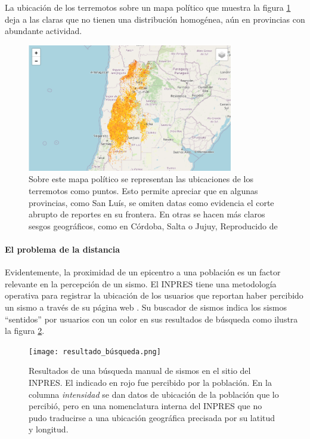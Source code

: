 \documentclass[a4paper]{report}
\begin{document}
La ubicación de los terremotos sobre un mapa político que muestra la figura \ref{fig:terremotosMapa} deja a las claras que no tienen una distribución homogénea, aún en provincias con abundante actividad.

\begin{figure}[!ht]
\centering
\includegraphics[width=0.8\textwidth]{terremotosMapa.png}
\caption{Sobre este mapa político se representan las ubicaciones de los terremotos como puntos. Esto permite apreciar que en algunas provincias, como San Luís, se omiten datas como evidencia el corte abrupto de reportes en su frontera. En otras se hacen más claros sesgos geográficos, como en Córdoba, Salta o Jujuy, 
Reproducido de \cite{daniela_parada_ic-datasets-docencia_nodate}}
\label{fig:terremotosMapa}
\end{figure}



\paragraph{El problema de la distancia}
Evidentemente, la proximidad de un epicentro a una población es un factor relevante en la percepción de un sismo.
El INPRES tiene una metodología operativa para registrar la ubicación de los usuarios que reportan haber percibido un sismo a través de su página web \cite{noauthor_acerca_nodate}.
Su buscador de sismos indica los sismos ``sentidos'' por usuarios con un color en sus resultados de búsqueda como ilustra la figura \ref{fig:resultado_búsqueda}.

\begin{figure}[!ht]
\centering
\texttt{[image: resultado\_búsqueda.png]}
\caption{Resultados de una búsqueda manual de sismos en el sitio del INPRES. El indicado en rojo fue percibido por la población. En la columna \emph{intensidad} se dan datos de ubicación de la población que lo percibió, pero en una nomenclatura interna del INPRES que no pudo traducirse a una ubicación geográfica precisada por su latitud y longitud.}
\label{fig:resultado_búsqueda}
\end{figure}
\end{document}
